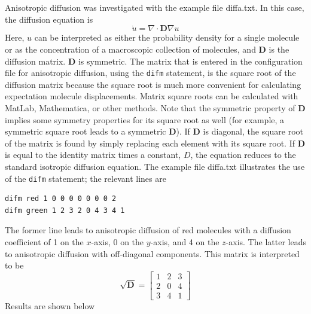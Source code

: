 \documentclass {book}
\newcommand {\ttt} {\texttt}
\begin{document}
Anisotropic diffusion was investigated with the example file diffa.txt. In this case, the diffusion equation is
$$\dot{u} = \nabla \cdot \mathbf{D} \nabla u$$
Here, $u$ can be interpreted as either the probability density for a single molecule or as the concentration of a macroscopic collection of molecules, and $\mathbf{D}$ is the diffusion matrix. $\mathbf{D}$ is symmetric. The matrix that is entered in the configuration file for anisotropic diffusion, using the \ttt{difm} statement, is the square root of the diffusion matrix because the square root is much more convenient for calculating expectation molecule displacements. Matrix square roots can be calculated with MatLab, Mathematica, or other methods. Note that the symmetric property of $\mathbf{D}$ implies some symmetry properties for its square root as well (for example, a symmetric square root leads to a symmetric $\mathbf{D}$). If $\mathbf{D}$ is diagonal, the square root of the matrix is found by simply replacing each element with its square root. If $\mathbf{D}$ is equal to the identity matrix times a constant, $D$, the equation reduces to the standard isotropic diffusion equation. The example file diffa.txt illustrates the use of the \ttt{difm} statement; the relevant lines are
\begin{lstlisting}[style=SSAC]
difm red 1 0 0 0 0 0 0 0 2
difm green 1 2 3 2 0 4 3 4 1
\end{lstlisting}
The former line leads to anisotropic diffusion of red molecules with a diffusion coefficient of 1 on the $x$-axis, 0 on the $y$-axis, and 4 on the $z$-axis. The latter leads to anisotropic diffusion with off-diagonal components. This matrix is interpreted to be
$$\sqrt{\mathbf{D}} = \left[ \begin{array}{ccc} 1 & 2 & 3\\ 2 & 0 & 4\\ 3 & 4 & 1 \end{array} \right]$$
Results are shown below
\end{document}
